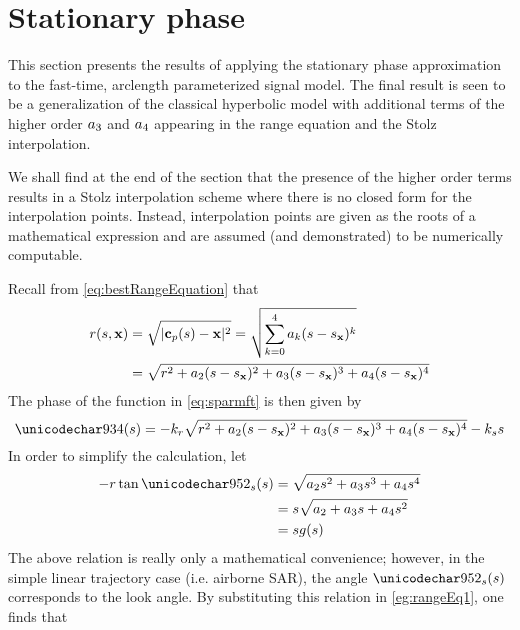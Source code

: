 \section{Stationary phase}
This section presents the results of applying the stationary phase approximation to the fast-time, arclength parameterized signal model. The final result is seen to be a generalization of the classical hyperbolic model with additional terms of the higher order $a_3$ and $a_4$  appearing in the range equation and the Stolz interpolation. 
\par
We shall find at the end of the section that the presence of the higher order terms results in a Stolz interpolation scheme where there is no closed form for the interpolation points. Instead, interpolation points are given as the roots of a mathematical expression and are assumed (and demonstrated) to be numerically computable.
\par
Recall from \eqref{eq:bestRangeEquation} that
\begin{equation}
\begin{split}
r(s, \mathbf{\mathbf{x}}) &= \sqrt{\lvert\mathbf{c}_p(s)-\mathbf{\mathbf{x}}\rvert^2} = \sqrt{\sum_{k=0}^4a_k(s-s_{\mathbf{x}})^k}\\
&=\sqrt{r^2 + a_2(s-s_{\mathbf{x}})^2 + a_3(s-s_{\mathbf{x}})^3 + a_4(s-s_{\mathbf{x}})^4}
\end{split}
\end{equation}
The phase of the function in \eqref{eq:sparmft} is then given by
\begin{equation}
 \Phi(\parm) = -\kr\sqrt{\targetrange^2 + \rcoeff_2(\parm-\targetxparm)^2 + \rcoeff_3(\parm-\targetxparm)^3 + \rcoeff_4(\parm-\targetxparm)^4} - \kparm\parm
 \label{eg:rangeEq1}
\end{equation}
In order to simplify the calculation, let
\begin{equation}
\begin{split}
 -\targetrange\tan\thetas(\parm) &= \sqrt{\rcoeff_2\parm^2 + \rcoeff_3\parm^3 + \rcoeff_4\parm^4}\\
 &=\parm\sqrt{\rcoeff_2 + \rcoeff_3\parm + \rcoeff_4\parm^2}\\
 &=\parm\gfunc(\parm)
\end{split}
\label{eq:gfunc}
\end{equation}
The above relation is really only a mathematical convenience; however, in the simple linear trajectory case (i.e. airborne SAR), the angle $\thetas(\parm)$ corresponds to the look angle. By substituting this relation in \eqref{eg:rangeEq1}, one finds that
